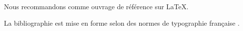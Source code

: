 \documentclass[11pt]{article}
\begin{document}
Nous recommandons \citet{Kopka:latex:4e} comme ouvrage de
référence sur {\LaTeX}.

La bibliographie est mise en forme selon des normes de
typographie française \citep{Malo:1996}.


\end{document}
